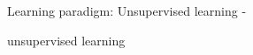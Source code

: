 %
%
%

\begin{frame}[t,allowframebreaks]{
    Learning paradigm: Unsupervised learning - }

    \gls{unsupervised learning}

\end{frame}